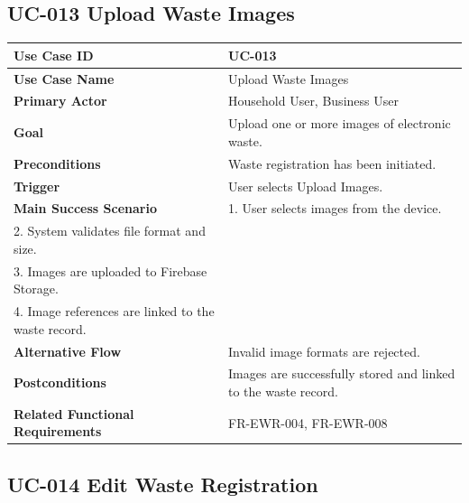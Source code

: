 \subsection{UC-013 Upload Waste Images}

\begin{longtable}{|p{4cm}|p{10cm}|}

\hline
\textbf{Use Case ID} &
UC-013 \\
\hline

\textbf{Use Case Name} &
Upload Waste Images \\
\hline

\textbf{Primary Actor} &
Household User, Business User \\
\hline

\textbf{Goal} &
Upload one or more images of electronic waste. \\
\hline

\textbf{Preconditions} &
Waste registration has been initiated. \\
\hline

\textbf{Trigger} &
User selects Upload Images. \\
\hline

\textbf{Main Success Scenario} &
1. User selects images from the device.\\
2. System validates file format and size.\\
3. Images are uploaded to Firebase Storage.\\
4. Image references are linked to the waste record.\\
\hline

\textbf{Alternative Flow} &
Invalid image formats are rejected.\\
\hline

\textbf{Postconditions} &
Images are successfully stored and linked to the waste record.\\
\hline

\textbf{Related Functional Requirements} &
FR-EWR-004, FR-EWR-008 \\
\hline

\end{longtable}

\subsection{UC-014 Edit Waste Registration}

